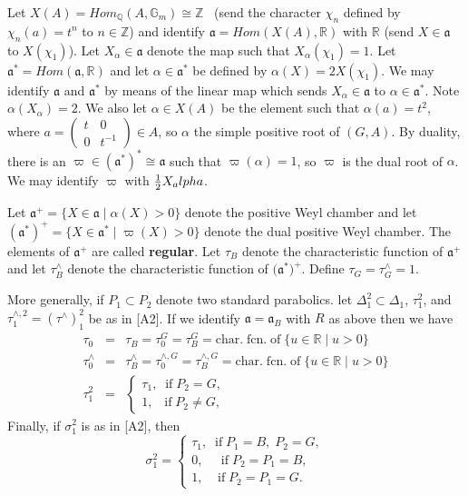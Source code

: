 \documentclass[12pt]{article}
\def\qqq{\mathbb{Q}}
\begin{document}
Let $X(A)=Hom_{\qqq}(A,{\mathbb{G}}_m)\cong {\mathbb{Z}}$ \
(send the character $\chi _n$ defined by $\chi _n(a)=t^n$
to $n\in {\mathbb{Z}}$) and identify ${{\mathfrak{a}}}=Hom(X(A),\mathbb{R})$
with $\mathbb{R}$ (send $X\in {\mathfrak{a}}$ to $X(\chi _1)$).
Let $X_\alpha\in {\mathfrak{a}}$ denote the map such that
$X_\alpha (\chi_1)=1$.
Let ${\mathfrak{a}}^{*}=Hom({\mathfrak{a}},\mathbb{R})$ and let $\alpha \in {\mathfrak{a}}^{*}$
be defined by $\alpha (X)=2X(\chi _1)$.
We may identify ${\mathfrak{a}}$ and ${\mathfrak{a}}^*$ by means of the
linear map which sends
$X_\alpha\in {\mathfrak{a}}$ to $\alpha\in {\mathfrak{a}}^*$.
Note $\alpha(X_\alpha )=2$.
We also let $\alpha \in X(A)$ be the
element such that $\alpha (a)=t^2$, where $a=\left( 
\begin{array}{cc}
t & 0 \\ 
0 & t^{-1}
\end{array}
\right) \in A$, so $\alpha $ the simple positive root of $(G,A)$. By
duality, there is an $\varpi \in ({\mathfrak{a}}^{*})^{*}\cong {\mathfrak{a}}$
such that 
$\varpi (\alpha )=1$, so $\varpi $ is the dual root of $\alpha $. We
may identify $\varpi$ with ${1\over 2}X_alpha$.

Let ${\mathfrak{a}}^{+}=\{X\in {\mathfrak{a}}\;|\;\alpha (X)>0\}$
denote the positive
Weyl chamber and let
$({\mathfrak{a}}^{*})^{+}=\{X\in {\mathfrak{a}}^{*}\;|\;\varpi (X)>0\}$
denote the dual positive Weyl chamber. The elements of
${\mathfrak{a}}^{+} $ are called {\bf regular}. Let $\tau _B$ denote
the characteristic
function of ${\mathfrak{a}}^{+}$ and let $\tau _B^{\wedge }$ denote the
characteristic function of $({\mathfrak{a}}^{*}\mathfrak{)}^{+}$.
Define $\tau _G=\tau _G^{\wedge }=1$.

More generally, if $P_1\subset P_2$ denote two standard
parabolics. let $\Delta _1^2\subset \Delta _1$, $\tau _1^2$,
and $\tau _1^{\wedge ,2}=(\tau^{\wedge })_1^2$ be as in [A2].
If we identify ${\mathfrak{a}}={\mathfrak{a}}_B$ with $R$
as above then we have 
\begin{eqnarray}
\tau _0 &=&\tau _B=\tau _0^G=\tau _B^G=\mathrm{char.\;fcn.\;of}
\;\{u\in {\mathbb{R}}\;|\;u>0\} \\
\tau _0^{\wedge }
&=&\tau _B^{\wedge }=\tau _0^{\wedge ,G}
=\tau _B^{\wedge,G}=\mathrm{char.\;fcn.\;of}
\;\{u\in {\mathbb{R}}\;|\;u>0\}  \nonumber \\
\tau _1^2 &=&\left\{ 
\begin{array}{c}
\tau _1,\;\;\mathrm{if}\;P_2=G, \\ 
1,\;\;\;\mathrm{if}\;P_2\neq G,
\end{array}
\right.  \nonumber
\end{eqnarray}
Finally, if $\sigma _1^2$ is as in [A2], then 
\begin{equation}
\sigma _1^2=\left\{ 
\begin{array}{c}
\tau _1,\;\;\mathrm{if}\;P_1=B,\;P_2=G, \\ 
0,\;\;\;\;\;\mathrm{if}\;P_2=P_1=B, \\ 
1,\;\;\;\;\mathrm{if}\;P_2=P_1=G.
\end{array}
\right.
\end{equation}
\end{document}
